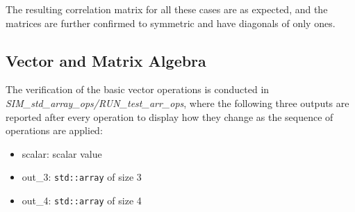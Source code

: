 \documentclass[11pt,fleqn]{report}
\begin{document}
The resulting correlation matrix for all these cases are as expected, and the matrices
are further confirmed to symmetric and have diagonals of only ones.

\subsection{Vector and Matrix Algebra}
The verification of the basic vector operations is conducted in 
\textit{SIM\_std\_array\_ops/RUN\_test\_arr\_ops}, where the following
three outputs are reported after every operation to display how they change
as the sequence of operations are applied:
\begin{itemize}
    \item scalar: scalar value 
    \item out\_3: \texttt{std::array} of size 3
    \item out\_4: \texttt{std::array} of size 4
\end{itemize}
\end{document}
